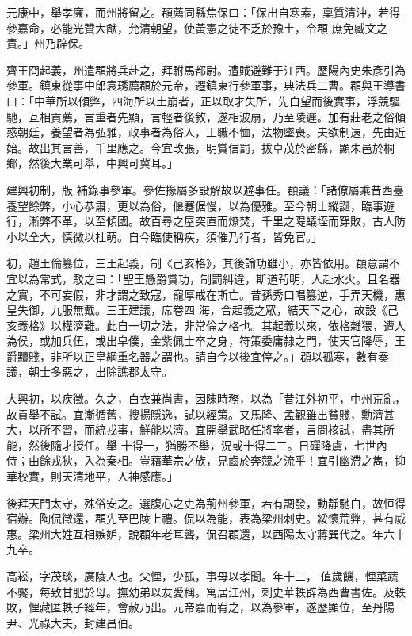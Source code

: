 \begin{pinyinscope}
 元康中，舉孝廉，而州將留之。頵薦同縣焦保曰：「保出自寒素，稟質清沖，若得參嘉命，必能光贊大猷，允清朝望，使黃憲之徒不乏於豫土，令頵
 庶免臧文之責。」州乃辟保。



 齊王冏起義，州遣頵將兵赴之，拜駙馬都尉。遭賊避難于江西。歷陽內史朱彥引為參軍。鎮東從事中郎袁琇薦頵於元帝，遷鎮東行參軍事，典法兵二曹。頵與王導書曰：「中華所以傾弊，四海所以土崩者，正以取才失所，先白望而後實事，浮競驅馳，互相貢薦，言重者先顯，言輕者後敘，遂相波扇，乃至陵遲。加有莊老之俗傾惑朝廷，養望者為弘雅，政事者為俗人，王職不恤，法物墜喪。夫欲制遠，先由近始。故出其言善，千里應之。今宜改張，明賞信罰，拔卓茂於密縣，顯朱邑於桐鄉，然後大業可舉，中興可冀耳。」



 建興初制，版
 補錄事參軍。參佐掾屬多設解故以避事任。頵議：「諸僚屬乘昔西臺養望餘弊，小心恭肅，更以為俗，偃蹇倨慢，以為優雅。至今朝士縱誕，臨事遊行，漸弊不革，以至傾國。故百尋之屋突直而燎焚，千里之隄蟻垤而穿敗，古人防小以全大，慎微以杜萌。自今臨使稱疾，須催乃行者，皆免官。」



 初，趙王倫篡位，三王起義，制《己亥格》，其後論功雖小，亦皆依用。頵意謂不宜以為常式，駁之曰：「聖王懸爵賞功，制罰糾違，斯道茍明，人赴水火。且名器之實，不可妄假，非才謂之致寇，寵厚戒在斯亡。昔孫秀口唱篡逆，手弄天機，惠皇失御，九服無戴。三王建議，席卷四
 海，合起義之眾，結天下之心，故設《己亥義格》以權濟難。此自一切之法，非常倫之格也。其起義以來，依格雜猥，遭人為侯，或加兵伍，或出皁僕，金紫佩士卒之身，符策委庸隸之門，使天官降辱，王爵黷賤，非所以正皇綱重名器之謂也。請自今以後宜停之。」頵以孤寒，數有奏議，朝士多惡之，出除譙郡太守。



 大興初，以疾徵。久之，白衣兼尚書，因陳時務，以為「昔江外初平，中州荒亂，故貢舉不試。宜漸循舊，搜揚隱逸，試以經策。又馬隆、孟觀雖出貧賤，勳濟甚大，以所不習，而統戎事，鮮能以濟。宜開舉武略任將率者，言問核試，盡其所能，然後隨才授任。舉
 十得一，猶勝不舉，況或十得二三。日磾降虜，七世內侍；由餘戎狄，入為秦相。豈藉華宗之族，見齒於奔競之流乎！宜引幽滯之雋，抑華校實，則天清地平，人神感應。」



 後拜天門太守，殊俗安之。選腹心之吏為荊州參軍，若有調發，動靜馳白，故恒得宿辦。陶侃徵還，頵先至巴陵上禮。侃以為能，表為梁州刺史。綏懷荒弊，甚有威惠。梁州大姓互相嫉妒，說頵年老耳聾，侃召頵還，以西陽太守蔣巽代之。年六十九卒。



 高崧，字茂琰，廣陵人也。父悝，少孤，事母以孝聞。年十三，
 值歲饑，悝菜蔬不饜，每致甘肥於母。撫幼弟以友愛稱。寓居江州，刺史華軼辟為西曹書佐。及軼敗，悝藏匿軼子經年，會赦乃出。元帝嘉而宥之，以為參軍，遂歷顯位，至丹陽尹、光祿大夫，封建昌伯。




\end{pinyinscope}

